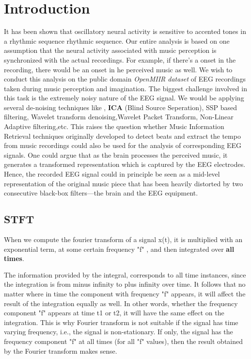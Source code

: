 \chapter{Introduction}

It has been shown that oscillatory neural activity is sensitive to accented tones in a rhythmic sequence rhythmic sequence. Our entire analysis is based on one assumption that the neural activity associated with music perception is synchronized with the actual recordings. For example, if there's a onset in the recording, there would be an onset in he perceived music as well. We wish to conduct this analysis on the public domain \emph{OpenMIIR dataset} of EEG recordings taken during music perception and imagination. The biggest challenge involved in this task is the extremely noisy nature of the EEG signal. We would be applying several de-noising techniques like \textbfPCA{}, \textbf{ICA} (Blind Source Seperation), SSP based filtering, Wavelet transform denoising,Wavelet Packet Transform, Non-Linear Adaptive filtering,etc. 
This raises the question whether Music Information Retrieval techniques originally developed to detect beats and extract the tempo from music recordings could also be used for the analysis of corresponding EEG signals. One could argue that as the brain processes the perceived music, it generates a transformed representation which is captured by the EEG electrodes. Hence, the recorded EEG signal could in principle be seen as a mid-level representation of the original music piece that has been heavily distorted by two consecutive black-box filters—the brain and the EEG equipment. 

\section{STFT}
When we compute the fourier transform of a signal x(t), it is multiplied with an exponential term, at some certain frequency "f" , and then integrated over \textbf{all times}. 

The information provided by the integral, corresponds to all time instances, since the integration is from minus infinity to plus infinity over time. It follows that no matter where in time the component with frequency "f" appears, it will affect the result of the integration equally as well. In other words, whether the frequency component "f" appears at time t1 or t2, it will have the same effect on the integration. This is why Fourier transform is not suitable if the signal has time varying frequency, i.e., the signal is non-stationary. If only, the signal has the frequency component "f" at all times (for all "f" values), then the result obtained by the Fourier transform makes sense.

